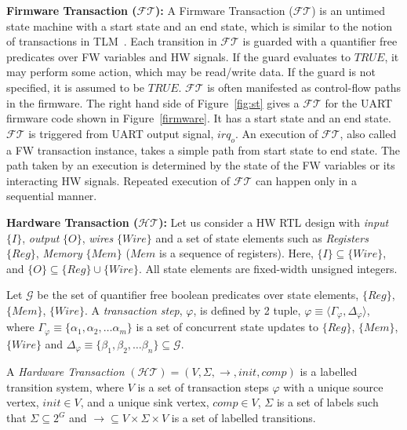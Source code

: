 \documentclass[sigconf]{acmart}
\begin{document}
\textbf{Firmware Transaction ($\mathcal{FT}$):} 
A Firmware Transaction ($\mathcal{FT}$) is an untimed state machine 
with a start state and an end state, which is similar to the notion of 
transactions in TLM~\cite{codes14}. 
Each transition in $\mathcal{FT}$ is guarded with a quantifier free predicates
over FW variables and HW signals.
If the guard evaluates to $TRUE$, it may perform some action, which may be 
read/write data. If the guard is not specified, it is assumed to be $TRUE$.
$\mathcal{FT}$ is often manifested as control-flow paths in the firmware. 
The right hand side of Figure~\ref{fig:st} gives a 
$\mathcal{FT}$ for the UART firmware code shown in Figure~\ref{firmware}. 
It has a start state and an end state. $\mathcal{FT}$ is triggered from 
UART output signal, $irq_o$. An execution of $\mathcal{FT}$, also called a 
FW transaction instance, takes a simple path from start state to end state. 
The path taken by an execution is determined by the state of 
the FW variables or its interacting HW signals. Repeated execution of 
$\mathcal{FT}$ can happen only in a sequential manner.  
 
\textbf{Hardware Transaction ($\mathcal{HT}$):} 
Let us consider a HW RTL design with \textit{input} $\{I\}$, 
\textit{output} $\{O\}$, \textit{wires} $\{Wire\}$ and a set of 
state elements such as \textit{Registers} $\{Reg\}$, \textit{Memory}
$\{Mem\}$ ($Mem$ is a sequence of registers). Here, 
$\{I\} \subseteq \{Wire\}$, and $\{O\} \subseteq \{Reg\} \cup \{Wire\}$.
All state elements are fixed-width unsigned integers. 

Let $\mathcal{G}$ be the set of quantifier free boolean predicates over 
state elements, $\{Reg\}$, $\{Mem\}$, $\{Wire\}$.  
A {\em transaction step}, $\varphi$, is defined by 2 tuple,
$\varphi \equiv \langle \Gamma_{\varphi}, \Delta_{\varphi} \rangle$, where 
$\Gamma_{\varphi} \equiv \{\alpha_1, \alpha_2, \ldots \alpha_{m}\}$
is a set of concurrent state updates to $\{Reg\}$, $\{Mem\}$, $\{Wire\}$ 
and $\Delta_{\varphi} \equiv \{\beta_1, \beta_2, \ldots \beta_{n}\} \subseteq
\mathcal{G}$.

A {\em Hardware Transaction} $(\mathcal{HT}) = (V, \Sigma, \rightarrow, init,
comp)$ is a labelled transition system, where $V$ is a set of transaction steps
$\varphi$ with a unique source vertex, $init \in V$, and a unique sink vertex, 
$comp \in V$, $\Sigma$ is a set of labels such that $\Sigma \subseteq 2^{G}$ and  
$\rightarrow \subseteq V \times \Sigma \times V$ is a set of labelled
transitions.
\end{document}
